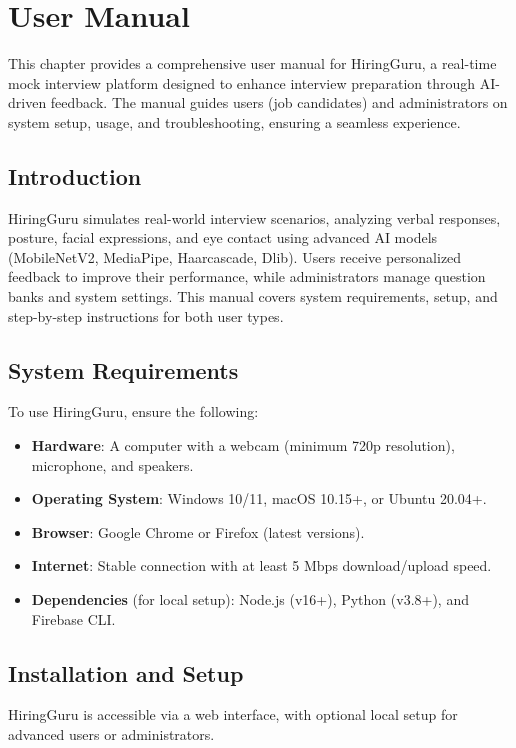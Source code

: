 \chapter{User Manual}
\label{ch:manual}

This chapter provides a comprehensive user manual for HiringGuru, a real-time mock interview platform designed to enhance interview preparation through AI-driven feedback. The manual guides users (job candidates) and administrators on system setup, usage, and troubleshooting, ensuring a seamless experience.

\section{Introduction}
HiringGuru simulates real-world interview scenarios, analyzing verbal responses, posture, facial expressions, and eye contact using advanced AI models (MobileNetV2, MediaPipe, Haarcascade, Dlib). Users receive personalized feedback to improve their performance, while administrators manage question banks and system settings. This manual covers system requirements, setup, and step-by-step instructions for both user types.

\section{System Requirements}
To use HiringGuru, ensure the following:
\begin{itemize}
    \item \textbf{Hardware}: A computer with a webcam (minimum 720p resolution), microphone, and speakers.
    \item \textbf{Operating System}: Windows 10/11, macOS 10.15+, or Ubuntu 20.04+.
    \item \textbf{Browser}: Google Chrome or Firefox (latest versions).
    \item \textbf{Internet}: Stable connection with at least 5 Mbps download/upload speed.
    \item \textbf{Dependencies} (for local setup): Node.js (v16+), Python (v3.8+), and Firebase CLI.
\end{itemize}

\section{Installation and Setup}
HiringGuru is accessible via a web interface, with optional local setup for advanced users or administrators.


